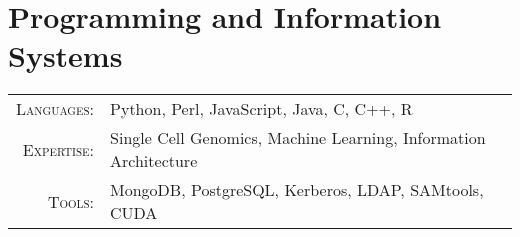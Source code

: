 \documentclass[a4paper,10pt]{article}
\begin{document}
\section{Programming and Information Systems}
\begin{tabular}{rl}
\textsc{Languages:}&Python, Perl, JavaScript, Java, C, C++, R\\
\textsc{Expertise:}&Single Cell Genomics, Machine Learning, Information Architecture\\
\textsc{Tools:}&MongoDB, PostgreSQL, Kerberos, LDAP, SAMtools, CUDA
\end{tabular}
\end{document}
